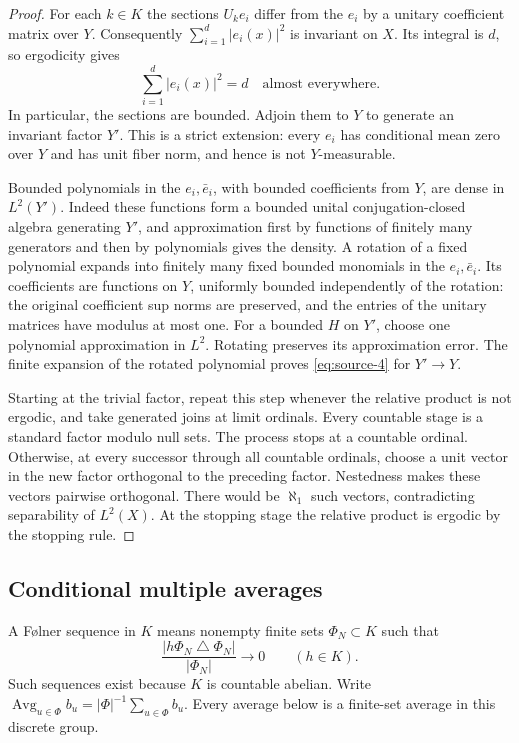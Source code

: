\begin{proof}
For each $k\in K$ the sections $U_ke_i$ differ from the $e_i$ by a
unitary coefficient matrix over $Y$.  Consequently
$\sum_{i=1}^d|e_i(x)|^2$ is invariant on $X$.  Its integral is $d$, so
ergodicity gives
\begin{equation}\label{eq:rigidity-bounded-basis}
 \sum_{i=1}^d|e_i(x)|^2=d\quad\text{almost everywhere}.
\end{equation}
In particular, the sections are bounded.  Adjoin them to $Y$ to generate
an invariant factor $Y'$.  This is a strict extension: every $e_i$ has
conditional mean zero over $Y$ and has unit fiber norm, and hence is not
$Y$-measurable.

Bounded polynomials in the $e_i,\bar e_i$, with bounded coefficients
from $Y$, are dense in $L^2(Y')$.  Indeed these functions form a bounded
unital conjugation-closed algebra generating $Y'$, and approximation
first by functions of finitely many generators and then by polynomials
gives the density.  A rotation of a fixed polynomial expands into
finitely many fixed bounded monomials in the $e_i,\bar e_i$.  Its
coefficients are functions on $Y$, uniformly bounded independently of
the rotation: the original coefficient sup norms are preserved, and
the entries of the unitary matrices have modulus at most one.  For a
bounded $H$ on $Y'$, choose one polynomial approximation in $L^2$.
Rotating preserves its approximation error.  The finite expansion of
the rotated polynomial proves \eqref{eq:source-4} for $Y'\to Y$.

Starting at the trivial factor, repeat this step whenever the relative
product is not ergodic, and take generated joins at limit ordinals.
Every countable stage is a standard factor modulo null sets.  The
process stops at a countable ordinal.  Otherwise, at every successor
through all countable ordinals, choose a unit vector in the new factor
orthogonal to the preceding factor.  Nestedness makes these vectors
pairwise orthogonal. There would be $\aleph_1$ such vectors,
contradicting separability of $L^2(X)$.  At the
stopping stage the relative product is ergodic by the stopping rule.
\end{proof}

\subsection{Conditional multiple averages}

A F\o lner sequence in $K$ means nonempty finite sets $\Phi_N\subset K$
such that
\[
 \frac{|h\Phi_N\mathbin{\triangle}\Phi_N|}{|\Phi_N|}\longrightarrow0
 \qquad(h\in K).
\]
Such sequences exist because $K$ is countable abelian.  Write
$\operatorname{Avg}_{u\in\Phi}b_u=|\Phi|^{-1}\sum_{u\in\Phi}b_u$.
Every average below is a finite-set average in this discrete group.

